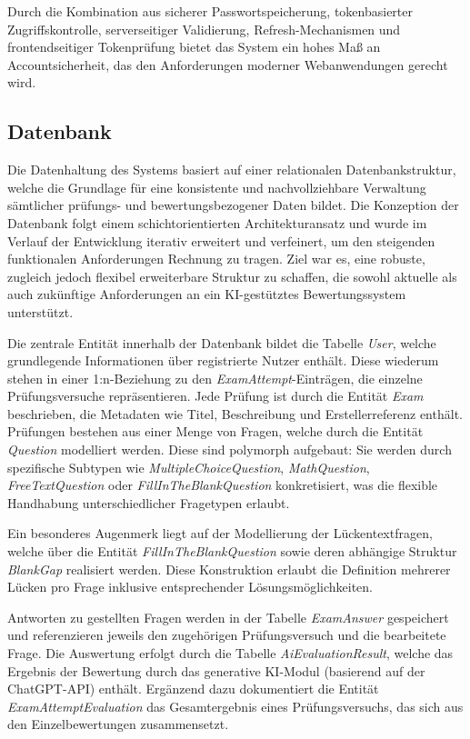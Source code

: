 \documentclass[a4paper,12pt]{article}
\begin{document}
Durch die Kombination aus sicherer Passwortspeicherung, tokenbasierter Zugriffskontrolle, serverseitiger Validierung, Refresh-Mechanismen und frontendseitiger Tokenprüfung bietet das System ein hohes Maß an Accountsicherheit, das den Anforderungen moderner Webanwendungen gerecht wird.



\subsection{Datenbank}
Die Datenhaltung des Systems basiert auf einer relationalen Datenbankstruktur, welche die Grundlage für eine konsistente und nachvollziehbare Verwaltung sämtlicher prüfungs- und bewertungsbezogener Daten bildet. Die Konzeption der Datenbank folgt einem schichtorientierten Architekturansatz und wurde im Verlauf der Entwicklung iterativ erweitert und verfeinert, um den steigenden funktionalen Anforderungen Rechnung zu tragen. Ziel war es, eine robuste, zugleich jedoch flexibel erweiterbare Struktur zu schaffen, die sowohl aktuelle als auch zukünftige Anforderungen an ein KI-gestütztes Bewertungssystem unterstützt.

Die zentrale Entität innerhalb der Datenbank bildet die Tabelle \textit{User}, welche grundlegende Informationen über registrierte Nutzer enthält. Diese wiederum stehen in einer 1:n-Beziehung zu den \textit{ExamAttempt}-Einträgen, die einzelne Prüfungsversuche repräsentieren. Jede Prüfung ist durch die Entität \textit{Exam} beschrieben, die Metadaten wie Titel, Beschreibung und Erstellerreferenz enthält. Prüfungen bestehen aus einer Menge von Fragen, welche durch die Entität \textit{Question} modelliert werden. Diese sind polymorph aufgebaut: Sie werden durch spezifische Subtypen wie \textit{MultipleChoiceQuestion}, \textit{MathQuestion}, \textit{FreeTextQuestion} oder \textit{FillInTheBlankQuestion} konkretisiert, was die flexible Handhabung unterschiedlicher Fragetypen erlaubt.

Ein besonderes Augenmerk liegt auf der Modellierung der Lückentextfragen, welche über die Entität \textit{FillInTheBlankQuestion} sowie deren abhängige Struktur \textit{BlankGap} realisiert werden. Diese Konstruktion erlaubt die Definition mehrerer Lücken pro Frage inklusive entsprechender Lösungsmöglichkeiten.

Antworten zu gestellten Fragen werden in der Tabelle \textit{ExamAnswer} gespeichert und referenzieren jeweils den zugehörigen Prüfungsversuch und die bearbeitete Frage. Die Auswertung erfolgt durch die Tabelle \textit{AiEvaluationResult}, welche das Ergebnis der Bewertung durch das generative KI-Modul (basierend auf der ChatGPT-API) enthält. Ergänzend dazu dokumentiert die Entität \textit{ExamAttemptEvaluation} das Gesamtergebnis eines Prüfungsversuchs, das sich aus den Einzelbewertungen zusammensetzt.
\end{document}
